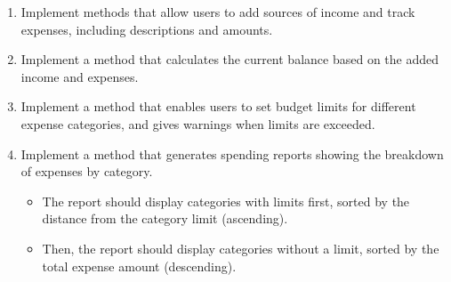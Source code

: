 \begin{enumerate}
    \item Implement methods that allow users to add sources of income and track expenses, including descriptions and amounts.
    \item Implement a method that calculates the current balance based on the added income and expenses.
    \item Implement a method that enables users to set budget limits for different expense categories, and gives warnings when limits are exceeded.
    \item Implement a method that generates spending reports showing the breakdown of expenses by category.
    \begin{itemize}
        \item The report should display categories with limits first, sorted by the distance from the category limit (ascending). 
        \item Then, the report should display categories without a limit, sorted by the total expense amount (descending).
    \end{itemize}
\end{enumerate}

